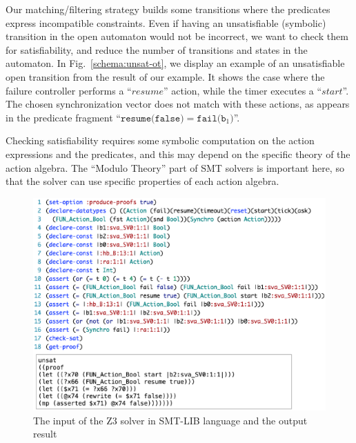 \documentclass{lncs/llncs}
\newcommand{\OTvar}{\texttt}
\begin{document}
Our matching/filtering strategy builds some transitions where
the predicates express incompatible constraints. Even if having an
unsatisfiable (symbolic) transition in the open automaton would not be incorrect,
we want to check them for satisfiability, and reduce the number of
transitions and states in the automaton.
In Fig.~\ref{schema:unsat-ot}, we display an example of an
unsatisfiable open transition 
from the result of our example. It shows the case where
the failure controller performs a ``$resume$'' action, while the timer
executes a ``$start$''. The chosen synchronization
vector does not match with these actions, as appears in the predicate
fragment ``$\OTvar{resume(false)}=\OTvar{fail(}\OTvar{b}_1\OTvar{)}$''.

Checking satisfiability requires some symbolic computation
on the action expressions and the predicates, and this 
may depend on the specific theory of the action algebra. 
The ``Modulo Theory'' part of SMT solvers is important here, so that
the solver can use specific properties of each action algebra.


\begin{figure}[t]
    \centerline{\includegraphics[width=\linewidth]{XFIG/SMTLIB3}}
  \caption{The input of the Z3 solver in SMT-LIB language and the output result}  \label{schema:smt-lib}
\end{figure}

\end{document}
